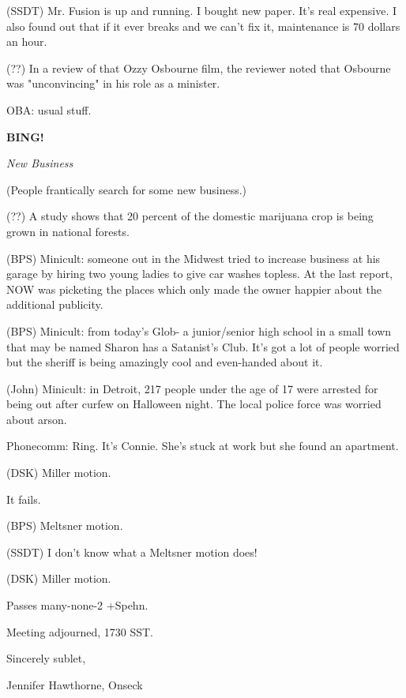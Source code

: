 \documentclass[12pt]{article}
\newcommand{\bing}{{\bf BING!} }
\newcommand{\goto}[1]{\bing \vskip 12pt \centerline{{\em{#1}}}}
\begin{document}
(SSDT) Mr. Fusion is up and running. I bought new paper. It's real expensive. I also found out that if it ever breaks and we can't fix it, maintenance is 70 dollars an hour.

(??) In a review of that Ozzy Osbourne film, the reviewer noted that Osbourne was "unconvincing" in his role as a minister.

OBA: usual stuff.

\goto{New Business}

(People frantically search for some new business.)

(??) A study shows that 20 percent of the domestic marijuana crop is being grown in national forests.

(BPS) Minicult: someone out in the Midwest tried to increase business at his garage by hiring two young ladies to give car washes topless. At the last report, NOW was picketing the places which only made the owner happier about the additional publicity.

(BPS) Minicult: from today's Glob- a junior/senior high school in a small town that may be named Sharon has a Satanist's Club. It's got a lot of people worried but the sheriff is being amazingly cool and even-handed about it.

(John) Minicult: in Detroit, 217 people under the age of 17 were arrested for being out after curfew on Halloween night. The local police force was worried about arson.

Phonecomm: Ring. It's Connie. She's stuck at work but she found an apartment.

(DSK) Miller motion.

It fails.

(BPS) Meltsner motion.

(SSDT) I don't know what a Meltsner motion does!

(DSK) Miller motion.

Passes many-none-2 +Spehn.

\vspace{12pt}

\noindent
Meeting adjourned, 1730 SST.

\vspace{18pt}

\centerline{Sincerely sublet,}
\centerline{Jennifer Hawthorne, Onseck}
\end{document}
